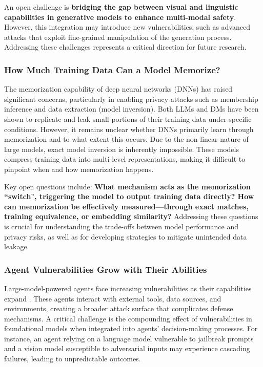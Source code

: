 An open challenge is \textbf{bridging the gap between visual and linguistic capabilities in generative models to enhance multi-modal safety}. However, this integration may introduce new vulnerabilities, such as advanced attacks that exploit fine-grained manipulation of the generation process. Addressing these challenges represents a critical direction for future research.

\subsubsection{How Much Training Data Can a Model Memorize?}
The memorization capability of deep neural networks (DNNs) has raised significant concerns, particularly in enabling privacy attacks such as membership inference and data extraction (model inversion). Both LLMs and DMs have been shown to replicate and leak small portions of their training data under specific conditions. However, it remains unclear whether DNNs primarily learn through memorization and to what extent this occurs.
Due to the non-linear nature of large models, exact model inversion is inherently impossible. These models compress training data into multi-level representations, making it difficult to pinpoint when and how memorization happens. 

Key open questions include: \textbf{What mechanism acts as the memorization ``switch", triggering the model to output training data directly? How can memorization be effectively measured—through exact matches, training equivalence, or embedding similarity?}
Addressing these questions is crucial for understanding the trade-offs between model performance and privacy risks, as well as for developing strategies to mitigate unintended data leakage.

\subsubsection{Agent Vulnerabilities Grow with Their Abilities}
Large-model-powered agents face increasing vulnerabilities as their capabilities expand \cite{gu2024agent}. These agents interact with external tools, data sources, and environments, creating a broader attack surface that complicates defense mechanisms. A critical challenge is the compounding effect of vulnerabilities in foundational models when integrated into agents' decision-making processes. For instance, an agent relying on a language model vulnerable to jailbreak prompts and a vision model susceptible to adversarial inputs may experience cascading failures, leading to unpredictable outcomes.

